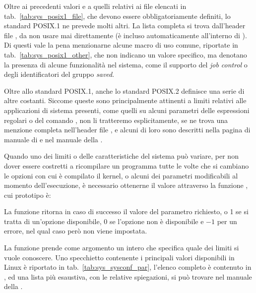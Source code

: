 Oltre ai precedenti valori e a quelli relativi ai file elencati in
tab.~\ref{tab:sys_posix1_file}, che devono essere obbligatoriamente definiti,
lo standard POSIX.1 ne prevede molti altri. La lista completa si trova
dall'header file , da non usare mai direttamente (è
incluso automaticamente all'interno di ). Di questi vale la
pena menzionarne alcune macro di uso comune, riportate in
tab.~\ref{tab:sys_posix1_other}, che non indicano un valore specifico, ma
denotano la presenza di alcune funzionalità nel sistema, come il supporto del
\textit{job control} o degli identificatori del gruppo \textit{saved}.

Oltre allo standard POSIX.1, anche lo standard POSIX.2 definisce una serie di
altre costanti. Siccome queste sono principalmente attinenti a limiti relativi
alle applicazioni di sistema presenti, come quelli su alcuni parametri delle
espressioni regolari o del comando , non li tratteremo esplicitamente,
se ne trova una menzione completa nell'header file ,
e alcuni di loro sono descritti nella pagina di manuale di  e
nel manuale della .

Quando uno dei limiti o delle caratteristiche del sistema può variare, per non
dover essere costretti a ricompilare un programma tutte le volte che si
cambiano le opzioni con cui è compilato il kernel, o alcuni dei parametri
modificabili al momento dell'esecuzione, è necessario ottenerne il valore
attraverso la funzione , cui prototipo è:

\begin{funcproto}{
}

{La funzione ritorna in caso di successo il valore del parametro richiesto, o
  1 se si tratta di un'opzione disponibile, 0 se l'opzione non è disponibile e
  $-1$ per un errore, nel qual caso però  non viene impostata.}  
\end{funcproto}

La funzione prende come argomento un intero che specifica quale dei limiti si
vuole conoscere. Uno specchietto contenente i principali valori disponibili in
Linux è riportato in tab.~\ref{tab:sys_sysconf_par}, l'elenco completo è
contenuto in , ed una lista più esaustiva, con le
relative spiegazioni, si può trovare nel manuale della .


